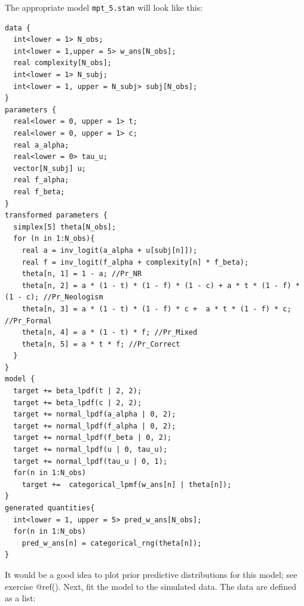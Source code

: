 \documentclass[12pt,]{krantz}
\newenvironment{Shaded}{\begin{snugshade}}{\end{snugshade}}
\newcommand{\DataTypeTok}[1]{\textcolor[rgb]{0.13,0.29,0.53}{#1}}
\newcommand{\KeywordTok}[1]{\textcolor[rgb]{0.13,0.29,0.53}{\textbf{#1}}}
\newcommand{\NormalTok}[1]{#1}
\newcommand{\OperatorTok}[1]{\textcolor[rgb]{0.81,0.36,0.00}{\textbf{#1}}}
\newcommand{\StringTok}[1]{\textcolor[rgb]{0.31,0.60,0.02}{#1}}
\theoremstyle{definition}
\theoremstyle{definition}
\theoremstyle{definition}
\theoremstyle{remark}
\begin{document}
The appropriate model \texttt{mpt\_5.stan} will look like this:

\begin{verbatim}
data {
  int<lower = 1> N_obs;
  int<lower = 1,upper = 5> w_ans[N_obs];
  real complexity[N_obs];
  int<lower = 1> N_subj;
  int<lower = 1, upper = N_subj> subj[N_obs];
}
parameters {
  real<lower = 0, upper = 1> t;
  real<lower = 0, upper = 1> c;
  real a_alpha;
  real<lower = 0> tau_u;
  vector[N_subj] u;
  real f_alpha;
  real f_beta;
}
transformed parameters {
  simplex[5] theta[N_obs];
  for (n in 1:N_obs){
    real a = inv_logit(a_alpha + u[subj[n]]);
    real f = inv_logit(f_alpha + complexity[n] * f_beta);
    theta[n, 1] = 1 - a; //Pr_NR
    theta[n, 2] = a * (1 - t) * (1 - f) * (1 - c) + a * t * (1 - f) * (1 - c); //Pr_Neologism
    theta[n, 3] = a * (1 - t) * (1 - f) * c +  a * t * (1 - f) * c;  //Pr_Formal
    theta[n, 4] = a * (1 - t) * f; //Pr_Mixed
    theta[n, 5] = a * t * f; //Pr_Correct
  }
}
model {
  target += beta_lpdf(t | 2, 2);
  target += beta_lpdf(c | 2, 2);
  target += normal_lpdf(a_alpha | 0, 2);
  target += normal_lpdf(f_alpha | 0, 2);
  target += normal_lpdf(f_beta | 0, 2);
  target += normal_lpdf(u | 0, tau_u);
  target += normal_lpdf(tau_u | 0, 1);
  for(n in 1:N_obs)
    target +=  categorical_lpmf(w_ans[n] | theta[n]);
}
generated quantities{
  int<lower = 1, upper = 5> pred_w_ans[N_obs];
  for(n in 1:N_obs)
    pred_w_ans[n] = categorical_rng(theta[n]);
}
\end{verbatim}

It would be a good idea to plot prior predictive distributions for this model; see exercise @ref().
Next, fit the model to the simulated data. The data are defined as a list:

\begin{Shaded}
\end{Shaded}
\end{document}
